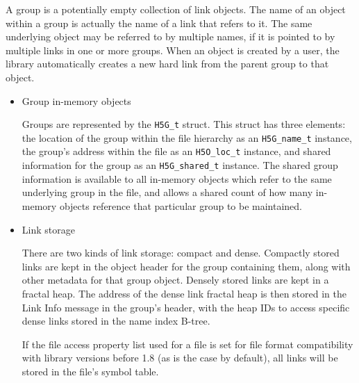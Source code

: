 
A group is a potentially empty collection of link objects. The name of an object within a group is actually the name of a link that refers to it. The same underlying object may be referred to by multiple names, if it is pointed to by multiple links in one or more groups. When an object is created by a user, the library automatically creates a new hard link from the parent group to that object.

\begin{itemize}

    \item Group in-memory objects

Groups are represented by the \texttt{H5G\_t} struct. This struct has three elements: the location of the group within the file hierarchy as an \texttt{H5G\_name\_t} instance, the group's address within the file as an \texttt{H5O\_loc\_t} instance, and shared information for the group as an \texttt{H5G\_shared\_t} instance. The shared group information is available to all in-memory objects which refer to the same underlying group in the file, and allows a shared count of how many in-memory objects reference that particular group to be maintained. %

    \item Link storage

There are two kinds of link storage: compact and dense. Compactly stored links are kept in the object header for the group containing them, along with other metadata for that group object. Densely stored links are kept in a fractal heap. The address of the dense link fractal heap is then stored in the Link Info message in the group's header, with the heap IDs to access specific dense links stored in the name index B-tree. 

If the file access property list used for a file is set for file format compatibility with library versions before 1.8 (as is the case by default), all links will be stored in the file's symbol table.



\end{itemize}

